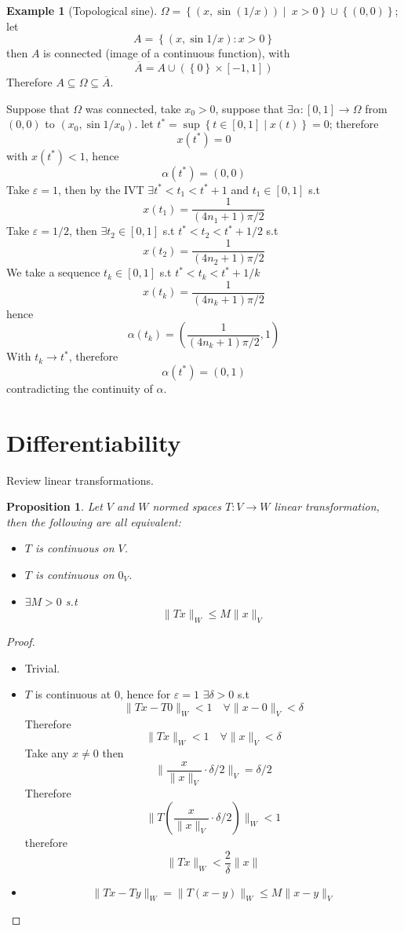 \documentclass[11pt,a4paper]{article}
\theoremstyle{definition}
\newtheorem{example}[definition]{Example}
\theoremstyle{plain}
\newtheorem{proposition}[definition]{Proposition}
\theoremstyle{remark}
\renewcommand{\set}[1]{\left\{ #1 \right\}}
\newcommand{\norm}[1]{\lVert #1 \rVert}
\begin{document}
\begin{example}[Topological sine]
    $\Omega = \set{(x, \sin(1/x)) \mid \ x > 0} \cup \set{(0,0)}$; let 
    $$A = \set{(x, \sin 1/x) \colon x > 0}$$
    then $A$ is connected (image of a continuous function), with 
    $$\overline{A} = A \cup (\set{0} \times [-1,1])$$
    Therefore $A \subseteq \Omega \subseteq \overline{A}$. 

    Suppose that $\Omega$ was connected, take $x_0 > 0$, suppose that $\exists \alpha \colon [0,1] \to \Omega$ from $(0,0)$ to $(x_0, \sin 1/x_0)$.
    let $t^* = \sup \set{t \in [0,1] \mid x(t)} = 0$; therefore 
    $$x(t^*) = 0$$
    with $x(t^*) < 1$, hence 
    $$\alpha (t^*) = (0,0)$$
    Take $\varepsilon = 1$, then by the IVT $\exists t^* < t_1 < t^* + 1$ and $t_1 \in [0,1]$ s.t 
    $$x(t_1) =  \frac{1}{(4n_1 + 1) \pi /2}$$
    Take $\varepsilon= 1/2$, then $\exists t_2 \in [0,1]$ s.t $t^* < t_2 < t^* + 1/2$  s.t 
    $$x(t_2) = \frac{1}{(4n_2 + 1) \pi /2}$$
    We take a sequence $t_k \in [0,1]$ s.t $t^* < t_k < t^* + 1/k$
    $$x(t_k) = \frac{1}{(4n_k + 1) \pi /2}$$
    hence 
    $$\alpha(t_k) = (\frac{1}{(4n_k + 1) \pi /2}, 1)$$
    With $t_k \to t^*$, therefore 
    $$\alpha (t^*) = (0,1)$$
    contradicting the continuity of $\alpha$.
\end{example}

\section{Differentiability} 
Review linear transformations. 

\begin{proposition}
    Let $V$ and $W$ normed spaces $T \colon V \to W$ linear transformation, then the following are all equivalent: 
    \begin{itemize}
        \item $T$ is continuous on $V$. 
        \item $T$ is continuous on $0_V$. 
        \item $\exists M > 0$ s.t 
        $$\norm{Tx}_W \le M \norm{x}_V$$
    \end{itemize}
\end{proposition}

\begin{proof}
    \begin{itemize}
        \item[$1 \implies 2$] Trivial. 
        \item[$2 \implies 3$] $T$ is continuous at $0$, hence for $\varepsilon = 1$ $\exists \delta > 0$ s.t 
        $$\norm{Tx - T0}_W < 1 \quad \forall \norm{x-0}_V < \delta$$
        Therefore 
        $$\norm{Tx}_W < 1 \quad \forall \norm{x}_V < \delta$$
        Take any $x \ne 0$ then 
        $$\norm{\frac{x}{\norm{x}_V} \cdot \delta / 2}_V = \delta / 2$$
        Therefore 
        $$\norm{T \left(\frac{x}{\norm{x}_V} \cdot \delta / 2\right)}_W < 1$$
        therefore 
        $$\norm{Tx}_W < \frac{2}{\delta} \norm{x}$$
        \item[$3\implies 1$] 
        $$\norm{Tx - Ty}_W = \norm{T(x-y)}_W \le M \norm{x-y}_V$$
    \end{itemize}
\end{proof}
\end{document}
